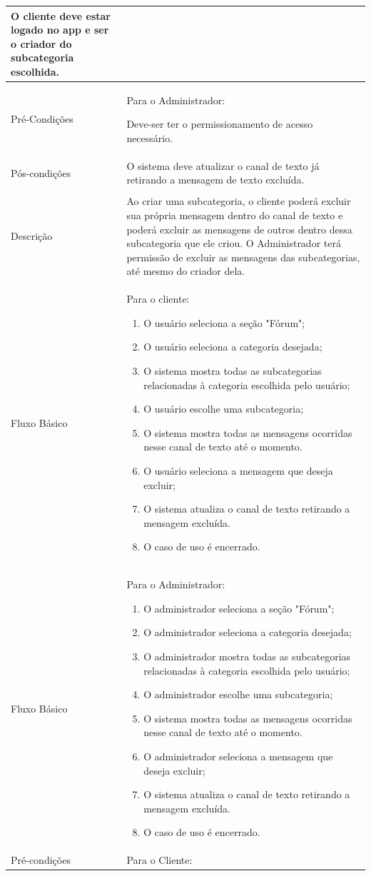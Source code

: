 \begin{landscape}
\begin{longtable}{|p{3.3cm}|p{10.3cm}|}
		O cliente deve estar logado no app e ser o criador do subcategoria escolhida.\\
		\hline
		Pré-Condições & Para o Administrador:
		
		Deve-ser ter o permissionamento de acesso necessário.\\
		\hline
		Pós-condições & O sistema deve atualizar o canal de texto já retirando a mensagem de texto excluída.\\
		\hline
		\thead{} & \thead{Ator} \\
		\hline
		Descrição & Ao criar uma subcategoria, o cliente poderá excluir sua própria mensagem dentro do canal de texto e poderá excluir as mensagens de outros dentro dessa subcategoria que ele criou. O Administrador terá permissão de excluir as mensagens das subcategorias, até mesmo do criador dela.\\
		\hline
		Fluxo Básico  & 
		Para o cliente:
		\begin{enumerate}
			\item O usuário seleciona a seção "Fórum";
			\item O usuário seleciona a categoria desejada;
			\item O sistema mostra todas as subcategorias relacionadas à categoria escolhida pelo usuário;
			\item O usuário escolhe uma subcategoria;
			\item O sistema mostra todas as mensagens ocorridas nesse canal de texto até o momento. 
			\item O usuário seleciona a mensagem que deseja excluir;
			\item O sistema atualiza o canal de texto retirando a mensagem excluída. 
			\item O  caso de uso é encerrado. 
		\end{enumerate}\\
		\hline
		Fluxo Básico  & 
		Para o Administrador:
		\begin{enumerate}
			\item O administrador seleciona a seção "Fórum";
			\item O administrador seleciona a categoria desejada;
			\item O administrador mostra todas as subcategorias relacionadas à categoria escolhida pelo usuário;
			\item O administrador escolhe uma subcategoria;
			\item O sistema mostra todas as mensagens ocorridas nesse canal de texto até o momento. 
			\item O administrador seleciona a mensagem que deseja excluir;
			\item O sistema atualiza o canal de texto retirando a mensagem excluída. 
			\item O caso de uso é encerrado. 
		\end{enumerate}\\
		\hline
		Pré-condições & Para o Cliente: 
		

\end{longtable}
\end{landscape}
